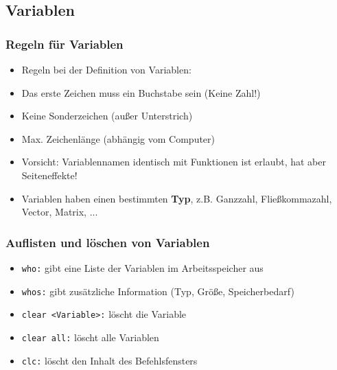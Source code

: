     \subsection{Variablen}
    \begin{frame}
      \frametitle{Regeln für Variablen}
      \begin{itemize}
        \item Regeln bei der Definition von Variablen:
        \item Das erste Zeichen muss ein Buchstabe sein (Keine Zahl!)
        \item Keine Sonderzeichen (außer Unterstrich)
        \item Max. Zeichenlänge (abhängig vom Computer)
        \item \alert{Vorsicht:} Variablennamen identisch mit Funktionen ist erlaubt, hat aber Seiteneffekte!
        \item Variablen haben einen bestimmten \textbf{Typ}, z.B. Ganzzahl, Fließkommazahl, Vector, Matrix, ...
      \end{itemize}
    \end{frame}

    \begin{frame}
      \frametitle{Auflisten und löschen von Variablen}
      \begin{itemize}
        \item \texttt{who:} gibt eine Liste der Variablen im Arbeitsspeicher aus
        \item \texttt{whos:} gibt zusätzliche Information (Typ, Größe, Speicherbedarf)
        \item \texttt{clear <Variable>:} löscht die Variable
        \item \texttt{clear all:} löscht alle Variablen
        \item \texttt{clc:} löscht den Inhalt des Befehlsfensters
      \end{itemize}
    \end{frame}


